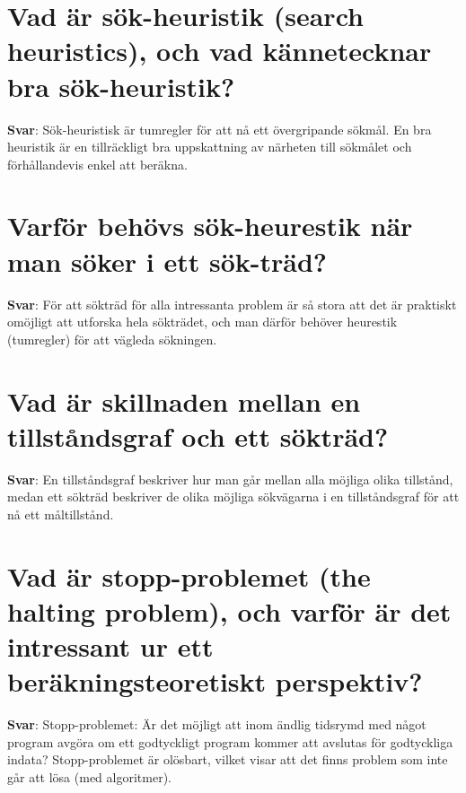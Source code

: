 \documentclass[a4paper,11pt,oneside]{book}
\begin{document}
\begin{sloppypar}
\section{Vad \"ar s\"ok-heuristik (search heuristics), och vad k\"annetecknar bra s\"ok-heuristik?}

\label{q:328:sa:sv:True}

\textbf{Svar}: S\"ok-heuristisk \"ar tumregler f\"or att n\r{a} ett \"overgripande s\"okm\r{a}l. En bra heuristik \"ar en tillr\"ackligt bra uppskattning av n\"arheten till s\"okm\r{a}let och f\"orh\r{a}llandevis enkel att ber\"akna.



\section{Varf\"or beh\"ovs s\"ok-heurestik n\"ar man s\"oker i ett s\"ok-tr\"ad?}

\label{q:329:sa:sv:True}

\textbf{Svar}: F\"or att s\"oktr\"ad f\"or alla intressanta problem \"ar s\r{a} stora att det \"ar praktiskt om\"ojligt att utforska hela s\"oktr\"adet, och man d\"arf\"or beh\"over heurestik (tumregler) f\"or att v\"agleda s\"okningen.



\section{Vad \"ar skillnaden mellan en tillst\r{a}ndsgraf och ett s\"oktr\"ad?}

\label{q:330:sa:sv:True}

\textbf{Svar}: En tillst\r{a}ndsgraf beskriver hur man g\r{a}r mellan alla m\"ojliga olika tillst\r{a}nd, medan ett s\"oktr\"ad beskriver de olika m\"ojliga s\"okv\"agarna i en tillst\r{a}ndsgraf f\"or att n\r{a} ett m\r{a}ltillst\r{a}nd.



\section{Vad \"ar stopp-problemet (the halting problem), och varf\"or \"ar det intressant ur ett ber\"akningsteoretiskt perspektiv?}

\label{q:331:sa:sv:True}

\textbf{Svar}: Stopp-problemet: \"Ar det m\"ojligt att inom \"andlig tidsrymd med n\r{a}got program avg\"ora om ett godtyckligt program kommer att avslutas f\"or godtyckliga indata? Stopp-problemet \"ar ol\"osbart, vilket visar att det finns problem som inte g\r{a}r att l\"osa (med algoritmer).




\end{sloppypar}
\end{document}
